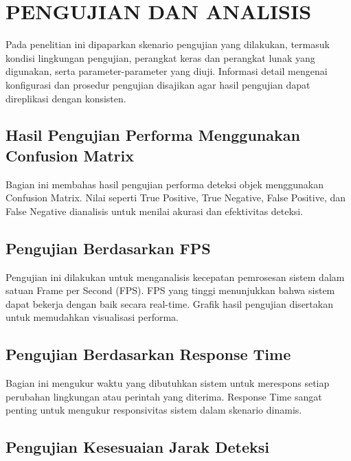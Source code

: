 \chapter{PENGUJIAN DAN ANALISIS}
\label{chap:pengujiananalisis}


Pada penelitian ini dipaparkan skenario pengujian yang dilakukan, termasuk kondisi lingkungan pengujian, perangkat keras dan perangkat lunak yang digunakan, serta parameter-parameter yang diuji. Informasi detail mengenai konfigurasi dan prosedur pengujian disajikan agar hasil pengujian dapat direplikasi dengan konsisten.

\section{Hasil Pengujian Performa Menggunakan Confusion Matrix}
\label{sec:hasilperformaconfisionMatrix}

Bagian ini membahas hasil pengujian performa deteksi objek menggunakan Confusion Matrix. Nilai seperti True Positive, True Negative, False Positive, dan False Negative dianalisis untuk menilai akurasi dan efektivitas deteksi.

\section{Pengujian Berdasarkan FPS}
\label{sec:pengujianberdasarkanfps}

Pengujian ini dilakukan untuk menganalisis kecepatan pemrosesan sistem dalam satuan Frame per Second (FPS). FPS yang tinggi menunjukkan bahwa sistem dapat bekerja dengan baik secara real-time. Grafik hasil pengujian disertakan untuk memudahkan visualisasi performa.

\section{Pengujian Berdasarkan Response Time}
\label{sec:pengujianberdasarkanresponsetime}

Bagian ini mengukur waktu yang dibutuhkan sistem untuk merespons setiap perubahan lingkungan atau perintah yang diterima. Response Time sangat penting untuk mengukur responsivitas sistem dalam skenario dinamis.

\section{Pengujian Kesesuaian Jarak Deteksi}
\label{sec:pengujiankesesuaianjarakdeteksi}

